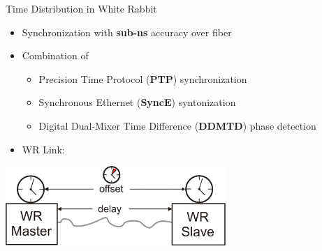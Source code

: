 \documentclass[compress,red]{beamer}
\begin{document}
\begin{frame}{Time Distribution in White Rabbit}

  \begin{itemize}
    \item Synchronization with {\bf sub-ns} accuracy over fiber
    \item Combination of
	\begin{itemize}
	  \item Precision Time Protocol ({\bf PTP}) synchronization
	  \item Synchronous Ethernet ({\bf SyncE}) syntonization
	  \item Digital Dual-Mixer Time Difference ({\bf DDMTD}) phase detection
	\end{itemize}
    \item WR Link:
  \end{itemize}

  \begin{center}
  \includegraphics[height=3cm]{protocol/wrLink.pdf}
  \end{center}

\end{frame}

\end{document}
